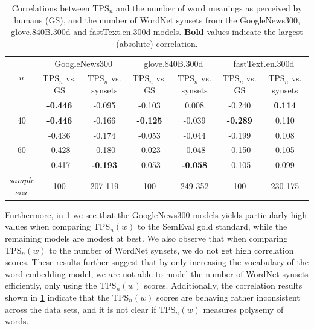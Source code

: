 \begin{table}[H]
    \centering
    \begin{tabular}{ccccccc}
    \toprule
    \multicolumn{1}{c}{\multirow{2}{*}{$n$}} & \multicolumn{2}{c}{GoogleNews300}    & \multicolumn{2}{c}{glove.840B.300d}              & \multicolumn{2}{c}{fastText.en.300d}             \\
    \cmidrule(l){2-7} 
    \multicolumn{1}{c}{}                   & \makecell[tc]{$\text{TPS}_n$ vs.\\GS} & \makecell[tc]{$\text{TPS}_n$ vs.\\synsets} & \makecell[tc]{$\text{TPS}_n$ vs.\\GS} & \makecell[tc]{$\text{TPS}_n$ vs.\\synsets} & \makecell[tc]{$\text{TPS}_n$ vs.\\GS} & \makecell[tc]{$\text{TPS}_n$ vs.\\synsets} \\ \midrule
    \trcolor 10           & \textbf{-0.446}  & -0.095       & -0.103  & 0.008        & -0.240  & \textbf{0.114}        \\
    40           & \textbf{-0.446}  & -0.166       & \textbf{-0.125}  & -0.039       & \textbf{-0.289}  & 0.110        \\
    \trcolor 50           & -0.436  & -0.174       & -0.053  & -0.044       & -0.199  & 0.108        \\
    60           & -0.428  & -0.180       & -0.023  & -0.048       & -0.150  & 0.105        \\
    \trcolor 100          & -0.417  & \textbf{-0.193}       & -0.053  & \textbf{-0.058}       & -0.105  & 0.099        \\
    \midrule
    \makecell[tc]{\textit{sample}\\\textit{size}} & 100 & 207 119 & 100 & 249 352 & 100 & 230 175 \\
    \bottomrule
    \end{tabular}
    \caption{Correlations between $\text{TPS}_n$ and the number of word meanings as perceived by humans (GS), and the number of WordNet synsets from the GoogleNews300, glove.840B.300d and fastText.en.300d models. \textbf{Bold} values indicate the largest (absolute) correlation.}
    \label{table:tps-n-correlation-external-word-embeddings}
\end{table}
Furthermore, in \cref{table:tps-n-correlation-external-word-embeddings} we see that the GoogleNews300 models yields particularly high values when comparing $\text{TPS}_n(w)$ to the SemEval gold standard, while the remaining models are modest at best. We also observe that when comparing $\text{TPS}_n(w)$ to the number of WordNet synsets, we do not get high correlation scores. These results further suggest that by only increasing the vocabulary of the word embedding model, we are not able to model the number of WordNet synsets efficiently, only using the $\text{TPS}_n(w)$ scores. Additionally, the correlation results shown in \cref{table:tps-n-correlation-external-word-embeddings} indicate that the $\text{TPS}_n(w)$ scores are behaving rather inconsistent across the data sets, and it is not clear if $\text{TPS}_n(w)$ measures polysemy of words.

